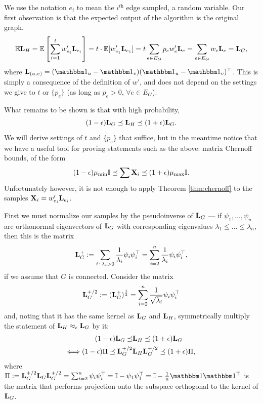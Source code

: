 \documentclass[11pt]{article}
\begin{document}
We use the notation $e_i$ to mean the $i^{\textit{th}}$ edge sampled, a random
variable. Our first observation is that the expected output of the algorithm is
the original graph. \[\E \V{L}_H = \E\brac{\sum_{i=1}^t w_{e_i}'\V{L}_{e_i}} =
t \cdot \E[w_{e_1}' \V{L}_{e_1}] = t \sum_{e \in E_G} p_e w_e' \V{L}_e =
\sum_{e \in E_G} w_e \V{L}_e = \V{L}_G,\] where $\V{L}_{(u,v)} = (\ones_u -
\ones_v)(\ones_u - \ones_v)^\T$. This is simply a consequence of the definition
of $w'$, and does not depend on the settings we give to $t$ or $\{p_e\}$ (as
long as $p_e > 0$, $\forall e \in E_G$).

What remains to be shown is that with high probability, \[(1-\eps) \V{L}_G \LE \V{L}_H
\LE (1+\eps) \V{L}_G.\] We will derive settings of $t$ and $\{p_e\}$ that suffice,
but in the meantime notice that we have a useful tool for proving statements
such as the above: matrix Chernoff bounds, of the form \[(1-\eps)\mm\bb{I} \LE
\sum \V{X}_i \LE (1+\eps)\mM\bb{I}.\] Unfortunately however, it is not enough to
apply Theorem \ref{thm:chernoff} to the samples $\V{X}_i = w_{e_i}'\V{L}_{e_i}$.

First we must normalize our samples by the pseudoinverse of $\V{L}_G$ --- if
$\psi_1,\dots,\psi_n$ are orthonormal eigenvectors of $\V{L}_G$ with corresponding
eigenvalues $\lambda_1 \le \dots \le \lambda_n$, then this is the matrix
\[\V{L}_G^+ := \sum_{i \,:\, \lambda_i > 0} \frac{1}{\lambda_i} \psi_i \psi_i^\T =
\sum_{i=2}^n \frac{1}{\lambda_i} \psi_i \psi_i^\T,\] if we assume that $G$ is
connected. Consider the matrix \[\V{L}_G^\phalf := (\V{L}_G^+)^\half = \sum_{i=2}^n
\frac{1}{\sqrt{\lambda_i}} \psi_i \psi_i^\T\] and, noting that it has the same
kernel as $\V{L}_G$ and $\V{L}_H$, symmetrically multiply the statement of $\V{L}_H
\approx_\eps \V{L}_G$ by it:
\begin{align*}
(1-\eps) \V{L}_G \LE & \V{L}_H \LE (1+\eps) \V{L}_G \\
\Longleftrightarrow
(1-\eps) \Pi \LE \V{L}_G^\phalf & \V{L}_H \V{L}_G^\phalf \LE (1+\eps) \Pi,
\end{align*}
where $\Pi := \V{L}_G^\phalf \V{L}_G \V{L}_G^\phalf = \sum_{i=2}^n \psi_i \psi_i^\T =
\bb{I} - \psi_1 \psi_1^\T = \bb{I} - \frac{1}{n}\ones\ones^\T$ is the matrix that
performs projection onto the subspace orthogonal to the kernel of $\V{L}_G$.
\end{document}
